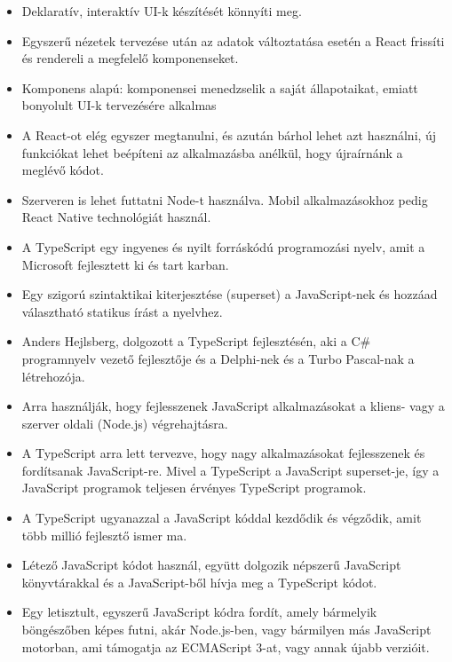 
\begin{itemize}
\item Deklaratív, interaktív UI-k készítését könnyíti meg. 
\item Egyszerű nézetek tervezése után az adatok változtatása esetén a React frissíti és rendereli a megfelelő komponenseket.
\item Komponens alapú: komponensei menedzselik a saját állapotaikat, emiatt bonyolult UI-k tervezésére alkalmas
\item A React-ot elég egyszer megtanulni, és azután bárhol lehet azt használni, új  funkciókat lehet beépíteni az alkalmazásba anélkül, hogy újraírnánk a meglévő kódot.
\item Szerveren is lehet futtatni Node-t használva. Mobil alkalmazásokhoz pedig React Native technológiát használ.
\end{itemize}


\begin{itemize}
\item A TypeScript egy ingyenes és nyilt forráskódú programozási nyelv, amit a Microsoft fejlesztett ki és tart karban. 
\item Egy szigorú szintaktikai kiterjesztése (superset) a JavaScript-nek és hozzáad választható statikus írást a nyelvhez. 
\item Anders Hejlsberg, dolgozott a TypeScript fejlesztésén, aki a C\# programnyelv vezető fejlesztője és a Delphi-nek és a Turbo Pascal-nak a létrehozója.
\item  Arra használják, hogy fejlesszenek JavaScript alkalmazásokat a kliens- vagy a szerver oldali (Node.js) végrehajtásra.
\item A TypeScript arra lett tervezve, hogy nagy alkalmazásokat fejlesszenek és fordítsanak JavaScript-re. Mivel a TypeScript a JavaScript superset-je, így a JavaScript programok teljesen érvényes TypeScript programok.
\item A TypeScript ugyanazzal a JavaScript kóddal kezdődik és végződik, amit több millió fejlesztő ismer ma. 
\item Létező JavaScript kódot használ, együtt dolgozik népszerű JavaScript könyvtárakkal és a JavaScript-ből hívja meg a TypeScript kódot.
\item Egy letisztult, egyszerű JavaScript kódra fordít, amely bármelyik böngészőben képes futni, akár Node.js-ben, vagy bármilyen más JavaScript motorban, ami támogatja az ECMAScript 3-at, vagy annak újabb verzióit.
\end{itemize}

